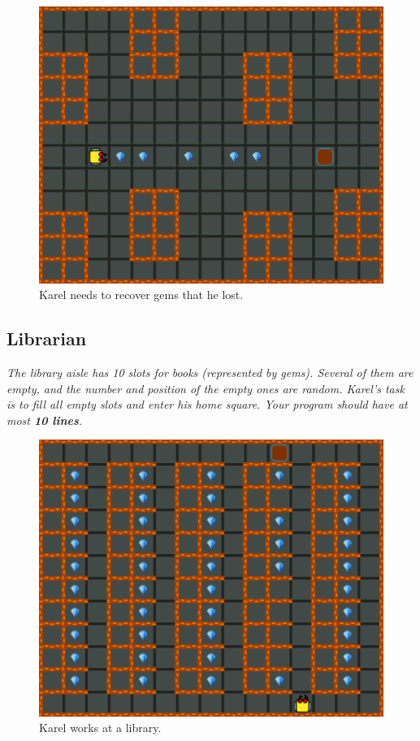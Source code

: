 \begin{figure}[!ht]
\begin{center}
\includegraphics[height=0.4\textwidth]{img/d01.png}
\end{center}
\vspace{-5mm}
\caption{Karel needs to recover gems that he lost.}
\label{fig:d01}
\vspace{-1.3cm}
\end{figure}


\subsection{Librarian}

{\em The library aisle has 10 slots for books (represented by gems). Several of them are empty, and the number and position of the empty ones are random. Karel's task is to fill all empty slots and enter his home square. Your program should have at most {\bf 10 lines}.}\\[-9mm]


\begin{figure}[!ht]
\begin{center}
\includegraphics[height=0.4\textwidth]{img/d02.png}
\end{center}
\vspace{-4mm}
\caption{Karel works at a library.}
\label{fig:d02}
\vspace{-12mm}
\end{figure}
\newpage


